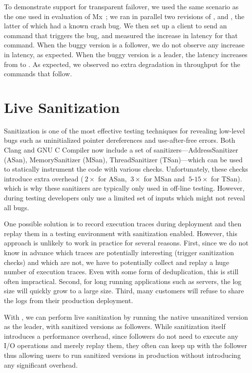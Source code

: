 To demonstrate support for transparent failover, we used the same scenario as
the one used in evaluation of Mx~\cite{mx}; we ran in parallel two revisions of
\redis,  and , the latter of which had a known
crash bug.  We then set up a client to send an  command that
triggers the bug, and measured the increase in latency for that command.  When
the buggy version is a follower, we do not observe any increase in latency, as
expected.  When the buggy version is a leader, the latency increases from
\redisnormallatency to \redisfailoverlatency.  As expected, we observed no
extra degradation in throughput for the commands that follow.

\section{Live Sanitization}
\label{sec:sanitization}

Sanitization is one of the most effective testing techniques for
revealing low-level bugs such as uninitialized pointer dereferences and
use-after-free errors.  Both Clang and GNU C Compiler now include a set
of sanitizers---AddressSanitizer (ASan), MemorySanitizer (MSan),
ThreadSanitizer (TSan)---which can be used to statically instrument
the code with various checks.  Unfortunately, these checks introduce
extra overhead (\eg $~2\times$ for ASan, $~3\times$ for MSan and
$~5$-$15\times$ for TSan).  which is why these sanitizers are typically
only used in off-line testing. However, during testing developers only
use a limited set of inputs which might not reveal all bugs.

One possible solution is to record execution traces during deployment
and then replay them in a testing environment with sanitization
enabled. However, this approach is unlikely to work in practice for
several reasons. First, since we do not know in advance which traces
are potentially interesting (\eg trigger sanitization checks) and
which are not, we have to potentially collect and replay a huge number
of execution traces. Even with some form of deduplication, this is
still often impractical. Second, for long running applications such as
servers, the log size will quickly grow to a large size. Third, many
customers will refuse to share the logs from their production
deployment.

With \nx, we can perform live sanitization by running the native
unsanitized version as the leader, with sanitized versions as
followers. While sanitization itself introduces a performance
overhead, since followers do not need to execute any I/O operations
and merely replay them, they often can keep up with the follower thus
allowing users to run sanitized versions in production without
introducing any significant overhead.

